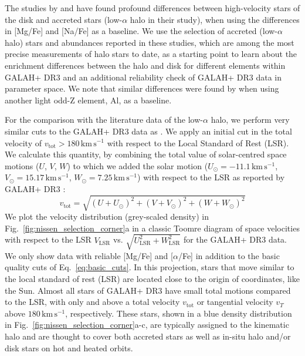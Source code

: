 \documentclass[fleqn,usenatbib]{mnras}
\newcommand{\kms}{\,\mathrm{km\,s^{-1}}}	%
\begin{document}
The studies by \citet{Nissen2010,Nissen2011,Nissen2012} and \citet{Nissen2014} have found profound differences between high-velocity stars of the disk and accreted stars (low-$\alpha$ halo in their study), when using the differences in [Mg/Fe] and [Na/Fe] as a baseline. We use the selection of accreted (low-$\alpha$ halo) stars and abundances reported in these studies, which are among the most precise measurements of halo stars to date, as a starting point to learn about the enrichment differences between the halo and disk for different elements within GALAH+ DR3 and an additional reliability check of GALAH+ DR3 data in parameter space. We note that similar differences were found by \citet{Hawkins2015} when using another light odd-Z element, Al, as a baseline.

For the comparison with the literature data of the low-$\alpha$ halo, we perform very similar cuts to the GALAH+ DR3 data as \cite{Nissen2010}. We apply an initial cut in the total velocity of $v_\text{tot} > 180\kms$ with respect to the Local Standard of Rest (LSR). We calculate this quantity, by combining the total value of solar-centred space motions ($U$, $V$, $W$) to which we added the solar motion ($U_\odot = -11.1\kms$, $V_\odot = 15.17\kms$, $W_\odot = 7.25\kms$) with respect to the LSR as reported by GALAH+ DR3 \citep{Buder2021}:
\begin{equation}
v_\text{tot} = \sqrt{ \left(U + U_\odot \right)^2 + \left(V + V_\odot \right)^2 + \left(W + W_\odot \right)^2} \label{eq:total_velocity}
\end{equation}
We plot the velocity distribution (grey-scaled density) in Fig.~\ref{fig:nissen_selection_corner}a in a classic Toomre diagram of space velocities with respect to the LSR $V_\text{LSR}$ vs. $\sqrt{U_\text{LSR}^2 + W_\text{LSR}^2}$ for the GALAH+ DR3 data. We only show data with reliable [Mg/Fe] and [$\alpha$/Fe] in addition to the basic quality cuts of Eq.~\ref{eq:basic_cuts}. In this projection, stars that move similar to the local standard of rest (LSR) are located close to the origin of coordinates, like the Sun. Almost all stars of GALAH+ DR3 have small total motions compared to the LSR, with only  and  above a total velocity $v_\text{tot}$ or tangential velocity $v_T$ above $180\kms$, respectively. These stars, shown in a blue density distribution in Fig.~\ref{fig:nissen_selection_corner}a-c, are typically assigned to the kinematic halo \citep[e.g.][]{Venn2004} and are thought to cover both accreted stars as well as in-situ halo and/or disk stars on hot and heated orbits.
\end{document}
